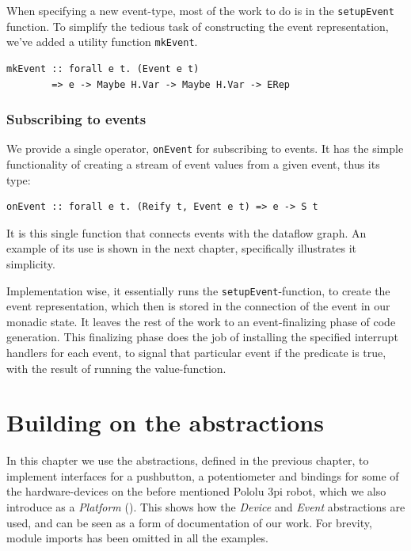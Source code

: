 \documentclass[a4paper, oneside, final]{memoir}
\let\fref\undefined
\let\Fref\undefined
\begin{document}
When specifying a new event-type, most of the work to do is in the
\verb|setupEvent| function. To simplify the tedious task
of constructing the event representation, we've added a utility
function \verb|mkEvent|. 
\begin{verbatim}
mkEvent :: forall e t. (Event e t) 
        => e -> Maybe H.Var -> Maybe H.Var -> ERep
\end{verbatim}

\subsection{Subscribing to events}
We provide a single operator, \verb|onEvent| for subscribing to
events. It has the simple functionality of creating a stream of event
values from a given event, thus its type:

\begin{verbatim}
onEvent :: forall e t. (Reify t, Event e t) => e -> S t
\end{verbatim}

\noindent
It is this single function that connects events with the dataflow
graph. An example of its use is shown in the next chapter,
specifically \Fref{fig:onEvent usage} illustrates it simplicity.

Implementation wise, it essentially runs the
\verb|setupEvent|-function, to create the event representation, which
then is stored in the connection of the event in our monadic state.
It leaves the rest of the work to an event-finalizing phase of code
generation.  This finalizing phase does the job of installing the
specified interrupt handlers for each event, to signal that particular
event if the predicate is true, with the result of running the
value-function.


\chapter{Building on the abstractions}
\label{chap:example code}

In this chapter we use the abstractions, defined in the previous
chapter, to implement interfaces for a pushbutton, a potentiometer and
bindings for some of the hardware-devices on the before mentioned
Pololu 3pi robot, which we also introduce as a \textit{Platform}
(\fref[plain]{sec:platforms}). This shows how the \textit{Device} and
\textit{Event} abstractions are used, and can be seen as a form of
documentation of our work. For brevity, module imports has been
omitted in all the examples.
\end{document}
